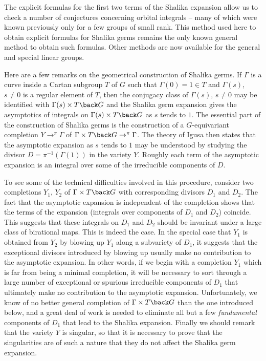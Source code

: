 \documentclass{memo-l}
\theoremstyle{definition}
\theoremstyle{remark}
\numberwithin{section}{chapter}
\numberwithin{equation}{chapter}
\begin{document}
The explicit formulas for the first two terms of the Shalika expansion
allow us to check a number of conjectures concerning orbital integrals
-- many of which were known previously only for a few groups of small
rank.  This method used here to obtain explicit formulas for Shalika
germs remains the only known general method to obtain such formulas.
Other methods are now available for the general and special linear
groups.


Here are a few remarks on the geometrical construction of Shalika
germs.  If $\Gamma$ is a curve inside a Cartan subgroup $T$ of $G$
such that $\Gamma(0) = 1\in T$ and $\Gamma(s)$, $s\ne0$ is a regular
element of $T$, then the conjugacy class of $\Gamma(s)$, $s\ne0$ may
be identified with $\Gamma(s)\times T\back G$ and the Shalika germ
expansion gives the asymptotics of integrals on $\Gamma(s)\times
T\back G$ as $s$ tends to $1$.  The essential part of the construction
of Shalika germs is the construction of a $G$-equivariant completion
$Y\to^\pi\Gamma$ of $\Gamma\times T\back G\to^\pi \Gamma$.  The theory
of Igusa then states that the asymptotic expansion as $s$ tends to $1$
may be understood by studying the divisor $D=\pi^{-1}(\Gamma(1))$ in
the variety $Y$.  Roughly each term of the asymptotic expansion is an
integral over some of the irreducible components of $D$.

To see some of the technical difficulties involved in this procedure,
consider two completions $Y_1$, $Y_2$ of $\Gamma\times T\back G$ with
corresponding divisors $D_1$ and $D_2$.  The fact that the asymptotic
expansion is independent of the completion shows that the terms of the
expansion (integrals over components of $D_1$ and $D_2$) coincide.
This suggests that these integrals on $D_1$ and $D_2$ should be
invariant under a large class of birational maps.  This is indeed the
case.  In the special case that $Y_1$ is obtained from $Y_2$ by
blowing up $Y_1$ along a subvariety of $D_1$, it suggests that the
exceptional divisors introduced by blowing up usually make no
contribution to the asymptotic expansion.  In other words, if we begin
with a completion $Y_1$ which is far from being a minimal completion,
it will be necessary to sort through a large number of exceptional or
spurious irreducible components of $D_1$ that ultimately make no
contribution to the asymptotic expansion.  Unfortunately, we know of
no better general completion of $\Gamma\times T\back G$ than the one
introduced below, and a great deal of work is needed to eliminate all
but a few {\it fundamental} components of $D_1$ that lead to the
Shalika expansion.  Finally we should remark that the variety $Y$ is
singular, so that it is necessary to prove that the singularities are
of such a nature that they do not affect the Shalika germ expansion.
\end{document}
